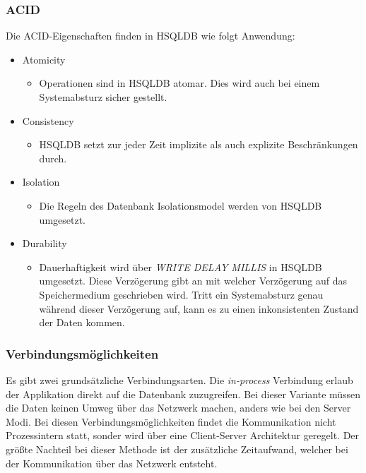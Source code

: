 \documentclass[draft,final]{vutinfth} %
\begin{document}
\subsubsection*{ACID}
Die ACID-Eigenschaften finden in HSQLDB wie folgt Anwendung:
\begin{itemize}
	\item Atomicity
	\begin{itemize}
		\item Operationen sind in HSQLDB atomar. Dies wird auch bei einem Systemabsturz sicher gestellt.
	\end{itemize}
	\item Consistency
	\begin{itemize}
		\item HSQLDB setzt zur jeder Zeit implizite als auch explizite Beschränkungen durch.
	\end{itemize}
	\item Isolation
	\begin{itemize}
		\item Die Regeln des Datenbank Isolationsmodel werden von HSQLDB umgesetzt.
	\end{itemize}
	\item Durability
	\begin{itemize}
		\item Dauerhaftigkeit wird über \textit{WRITE DELAY MILLIS} in HSQLDB umgesetzt. Diese Verzögerung gibt an mit welcher Verzögerung auf das Speichermedium geschrieben wird. Tritt ein Systemabsturz genau während dieser Verzögerung auf, kann es zu einen inkonsistenten Zustand der Daten kommen.
	\end{itemize}
\end{itemize}

\subsubsection*{Verbindungsmöglichkeiten}

Es gibt zwei grundsätzliche Verbindungsarten. Die \textit{in-process} Verbindung erlaub der Applikation direkt auf die Datenbank zuzugreifen. Bei dieser Variante müssen die Daten keinen Umweg über das Netzwerk machen, anders wie bei den Server Modi. Bei diesen Verbindungsmöglichkeiten findet die Kommunikation nicht Prozessintern statt, sonder wird über eine Client-Server Architektur geregelt. Der grö\ss te Nachteil bei dieser Methode ist der zusätzliche Zeitaufwand, welcher bei der Kommunikation über das Netzwerk entsteht. 
\end{document}

